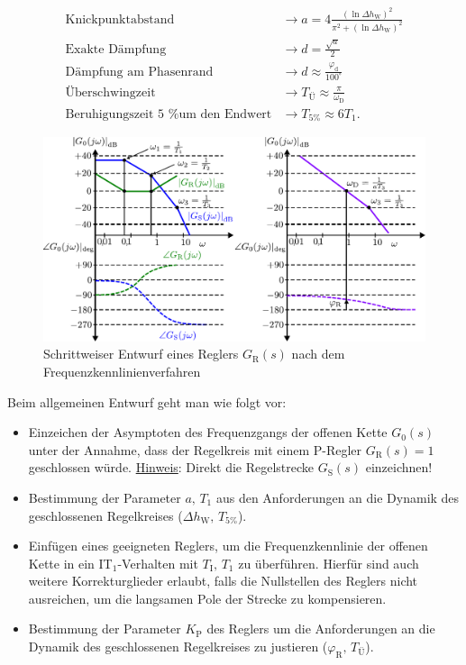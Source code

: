 %
\begin{equation*}
\begin{aligned}
%
\text{Knickpunktabstand} &\rightarrow a = 4\frac{\left(\ln\Delta h_{\text{W}}\right)^{2}}{\pi^{2}+\left(\ln\Delta h_{\text{W}}\right)^{2}}\\
\text{Exakte Dämpfung} &\rightarrow d=\frac{\sqrt{a}}{2}\\
\text{Dämpfung am Phasenrand} &\rightarrow d\approx\frac{\varphi_{\text{d}}}{100^{\circ}}\\
\text{Überschwingzeit} &\rightarrow T_{\text{Ü}}\approx\frac{\pi}{\omega_{\text{D}}}\\
\text{Beruhigungszeit 5 \% um den Endwert} &\rightarrow T_{5\%} \approx 6T_{1}.
%
\end{aligned}
\end{equation*}
%
\begin{figure}[ht!]
	\centering
	\includegraphics[width=1\linewidth]{Abbildungen/Reglerentwurf/PDF/FrequenzkennlinieEntwurf.pdf}
	\caption{Schrittweiser Entwurf eines Reglers $G_{\text{R}}(s)$ nach dem Frequenzkennlinienverfahren}
	\label{fig:frequenzkennlinie}
\end{figure}
%
%
Beim allgemeinen Entwurf geht man wie folgt vor:
%
\begin{itemize}
	\item Einzeichen der Asymptoten des Frequenzgangs der offenen Kette $G_{0}(s)$ unter der Annahme, dass der Regelkreis mit einem P-Regler $G_{\text{R}}(s)=1$ geschlossen würde. \underline{Hinweis}: Direkt die Regelstrecke $G_{\text{S}}(s)$ einzeichnen!
	\item Bestimmung der Parameter $a,\,T_{1}$ aus den Anforderungen an die Dynamik des geschlossenen Regelkreises ($\Delta h_{\text{W}},\,T_{5\%}$).
	\item Einfügen eines geeigneten Reglers, um die Frequenzkennlinie der offenen Kette in ein IT$_{1}$-Verhalten mit $T_{\text{I}},\,T_{1}$ zu überführen. Hierfür sind auch weitere Korrekturglieder erlaubt, falls die Nullstellen des Reglers nicht ausreichen, um die langsamen Pole der Strecke zu kompensieren.
	\item Bestimmung der Parameter $K_{\text{P}}$ des Reglers um die Anforderungen an die Dynamik des geschlossenen Regelkreises zu justieren ($\varphi_{\text{R}},\,T_{\text{Ü}}$).
\end{itemize}

